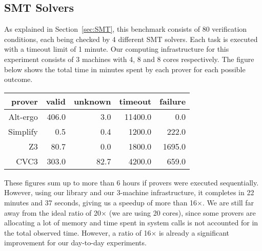 \documentclass[a4paper,12pt]{article}
\begin{document}









\subsection{SMT Solvers}

As explained in Section~\ref{sec:SMT}, this benchmark consists of 80
verification conditions, each being checked by 4 different SMT
solvers. Each task is executed with a timeout limit of 1 minute.
Our computing
infrastructure for this experiment consists of 3 machines with 4, 8 and 8 cores
respectively. 
The figure below shows the total time in minutes spent by each prover
for each possible outcome.
\begin{center}
  \begin{tabular}{|r||r|r|r|r|}
    \hline
    prover   & valid & unknown & timeout & failure
    \\\hline\hline
    Alt-ergo & 406.0 & 3.0   &  11400.0 & 0.0       
    \\\hline
    Simplify &  0.5   & 0.4   &  1200.0 & 222.0   
    \\\hline
    Z3       & 80.7   & 0.0   &  1800.0 & 1695.0   
    \\\hline
    CVC3     & 303.0  & 82.7  &  4200.0 & 659.0   
    \\\hline
  \end{tabular}
\end{center}
These figures sum up to more than 6 hours if provers were executed
sequentially. However, using our library and our 3-machine
infrastructure, it completes in 22 minutes and 37 seconds, giving us a
speedup of more than 16$\times$. We are still far away from the ideal
ratio of 20$\times$ (we are using 20 cores), since some provers are
allocating a lot of memory and time spent in system calls is not
accounted for in the total observed time. However, a ratio of
16$\times$ is already a significant improvement for our day-to-day
experiments. 
\end{document}
